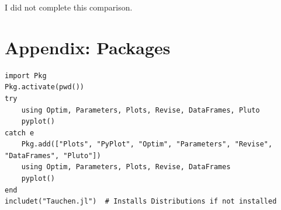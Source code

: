 \documentclass[12pt]{article}
\begin{document}
I did not complete this comparison.










\newpage
\section*{Appendix: Packages}
\begin{lstlisting}[language=JuliaLocal, style=julia]
import Pkg
Pkg.activate(pwd())
try
    using Optim, Parameters, Plots, Revise, DataFrames, Pluto
    pyplot()
catch e
    Pkg.add(["Plots", "PyPlot", "Optim", "Parameters", "Revise", "DataFrames", "Pluto"])
    using Optim, Parameters, Plots, Revise, DataFrames
    pyplot()
end
includet("Tauchen.jl")  # Installs Distributions if not installed
\end{lstlisting}












\newpage
\end{document}

